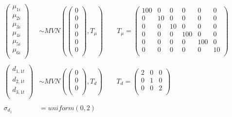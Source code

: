 \documentclass[11pt,final,fleqn]{article}\usepackage[]{graphicx}\usepackage[]{color}
\theoremstyle{plain}
\begin{document}
{\begin{equation} \label{eqn:multistate-nma-priors}
\begin{aligned}
\begin{pmatrix}
\mu_{1i}  \\
\mu_{2i}  \\
\mu_{3i}  \\
\mu_{4i}  \\
\mu_{5i}  \\
\mu_{6i}  \\
\end{pmatrix} 
&\sim 
MVN\left(
\begin{pmatrix}
0  \\
0  \\
0  \\
0  \\
0  \\
0 \\
\end{pmatrix}, 
T_\mu
\right) 
\qquad
T_\mu =
\begin{pmatrix}
100 & 0 & 0 & 0 & 0 & 0 \\
0 & 10 & 0 & 0 & 0 & 0 \\
0 & 0 & 10 & 0 & 0 & 0 \\
0 & 0 & 0 & 100 & 0 & 0 \\
0 & 0 & 0 & 0 & 100 & 0 \\
0 & 0 & 0 & 0 & 0 & 10 \\
\end{pmatrix}\\\\
%
\begin{pmatrix}
d_{1, 1t}  \\
d_{2, 1t}  \\
d_{3, 1t}  \\
\end{pmatrix} 
&\sim 
MVN\left(
\begin{pmatrix}
0  \\
0  \\
0 \\
\end{pmatrix}, 
T_d
\right) 
\qquad
T_d =
\begin{pmatrix}
2 & 0 & 0  \\
0 & 1 & 0   \\
0 & 0 & 2  \\
\end{pmatrix} \\
%
\\
\sigma_{d_{1}} &= uniform(0, 2)  \\
\end{aligned}
\end{equation}

}
\end{document}

